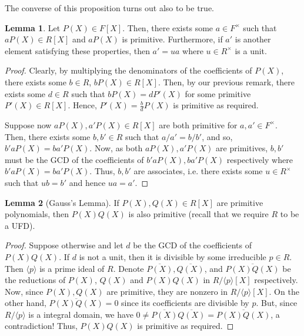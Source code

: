 \documentclass[]{article}
\theoremstyle{definition}
\theoremstyle{definition}
\newtheorem{lemma}{Lemma}[section]
\begin{document}
The converse of this proposition turns out also to be true.

\begin{lemma}
  Let \(P(X) \in F[X]\). Then, there exists some \(a \in F^\times\) such that 
  \(aP(X) \in R[X]\) and \(aP(X)\) is primitive. Furthermore, if \(a'\) is 
  another element satisfying these properties, then \(a' = ua\) where 
  \(u \in R^\times\) is a unit.
\end{lemma}
\begin{proof}
  Clearly, by multiplying the denominators of the coefficients of \(P(X)\), 
  there exists some \(b \in R\), \(b P(X) \in R[X]\). Then, by our previous 
  remark, there exists some \(d \in R\) such that \(bP(X) = dP'(X)\) for some 
  primitive \(P'(X) \in R[X]\). Hence, \(P'(X) = \frac{b}{d}P(X)\) is primitive
  as required.

  Suppose now \(aP(X), a'P(X) \in R[X]\) are both primitive for 
  \(a, a' \in F^\times\). Then, there exists some \(b, b' \in R\) such that
  \(a / a' = b / b'\), and so, \(b'a P(X) = ba'P(X)\). Now, as both 
  \(aP(X), a'P(X)\) are primitives, \(b, b'\) must be the GCD of the coefficients 
  of \(b'a P(X), ba'P(X)\) respectively where \(b'a P(X) = ba'P(X)\). 
  Thus, \(b, b'\) are associates, i.e. there exists some \(u \in R^\times\) 
  such that \(ub = b'\) and hence \(ua = a'\).
\end{proof}

\begin{lemma}[Gauss's Lemma]
  If \(P(X), Q(X) \in R[X]\) are primitive polynomials, then \(P(X)Q(X)\) is 
  also primitive (recall that we require \(R\) to be a UFD).
\end{lemma}
\begin{proof}
  Suppose otherwise and let \(d\) be the GCD of the coefficients of 
  \(P(X)Q(X)\). If \(d\) is not a unit, then it is divisible by some 
  irreducible \(p \in R\). Then \(\langle p \rangle\) is a prime ideal of \(R\). 
  Denote \(\overline{P(X)}, \overline{Q(X)}\), and \(\overline{P(X)Q(X)}\) 
  be the reductions of \(P(X)\), \(Q(X)\) and \(P(X)Q(X)\) in 
  \(R / \langle p \rangle[X]\) respectively. Now, since \(P(X), Q(X)\) are 
  primitive, they are nonzero in \(R / \langle p \rangle[X]\). On the other 
  hand, \(\overline{P(X)Q(X)} = 0\) since its coefficients are divisible by 
  \(p\). But, since \(R / \langle p \rangle\) is a integral domain, 
  we have \(0 \neq \overline{P(X)} \overline{Q(X)} = \overline{P(X)Q(X)}\), 
  a contradiction! Thus, \(P(X)Q(X)\) is primitive as required.
\end{proof}
\end{document}
